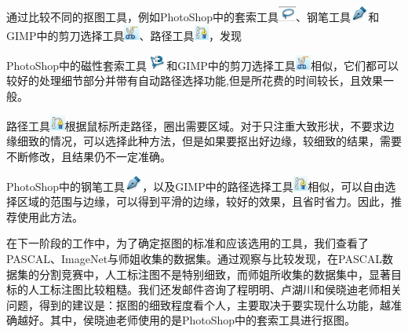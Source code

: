 \documentclass[12pt]{article}
\begin{document}
通过比较不同的抠图工具，例如PhotoShop中的套索工具\includegraphics[height=0.2in]{taosuo.png}、钢笔工具\includegraphics[height=0.2in]{gangbi.png}和GIMP中的剪刀选择工具\includegraphics[height=0.2in]{jiandao.png}、路径工具\includegraphics[height=0.2in]{lujing.png}，发现
\begin{itemize*}
\item PhotoShop中的磁性套索工具\includegraphics[height=0.2in]{cixing.png}和GIMP中的剪刀选择工具\includegraphics[height=0.2in]{jiandao.png}相似，它们都可以较好的处理细节部分并带有自动路径选择功能,但是所花费的时间较长，且效果一般。
\item 路径工具\includegraphics[height=0.2in]{lujing.png}根据鼠标所走路径，圈出需要区域。对于只注重大致形状，不要求边缘细致的情况，可以选择此种方法，但是如果要抠出好边缘，较细致的结果，需要不断修改，且结果仍不一定准确。
\item PhotoShop中的钢笔工具\includegraphics[height=0.2in]{gangbi.png}，以及GIMP中的路径选择工具\includegraphics[height=0.2in]{lujing.png}相似，可以自由选择区域的范围与边缘，可以得到平滑的边缘，较好的效果，且省时省力。因此，推荐使用此方法。\\
\end{itemize*}

 在下一阶段的工作中，为了确定抠图的标准和应该选用的工具，我们查看了PASCAL、ImageNet与师姐收集的数据集。通过观察与比较发现，在PASCAL数据集的分割竞赛中，人工标注图不是特别细致，而师姐所收集的数据集中，显著目标的人工标注图比较粗糙。我们还发邮件咨询了程明明、卢湖川和侯晓迪老师相关问题，得到的建议是：抠图的细致程度看个人，主要取决于要实现什么功能，越准确越好。其中，侯晓迪老师使用的是PhotoShop中的套索工具进行抠图。\\
\end{document}
